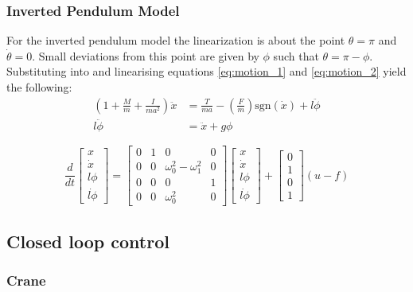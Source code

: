 \documentclass{article}
\begin{document}
\subsubsection{Inverted Pendulum Model}

For the inverted pendulum model the linearization is about the point $\theta = \pi$ and $\dot{\theta} = 0$.
Small deviations from this point are given by $\phi$ such that $\theta = \pi - \phi$.
Substituting into and linearising equations \ref{eq:motion_1} and \ref{eq:motion_2} yield the following:
\begin{align}
  \left( 1 + \frac{M}{m} + \frac{I}{ma^2} \right) \ddot{x} &= \frac{T}{ma} - \left(\frac{F}{m} \right)\text{sgn}(\dot{x}) + l \ddot{\phi} \\
  l \ddot{\phi} &= \ddot{x} + g\phi \label{eq:invp_motion_2}
\end{align}

\begin{equation}
  \frac{d}{dt} 
  \begin{bmatrix}
     x \\ \dot{x} \\ l\phi \\ \dot{l\phi} \end{bmatrix} = \begin{bmatrix} 
      0 & 1 & 0 & 0 \\ 0 & 0 & \omega_0^2 - \omega_1^2 & 0 \\ 0 & 0 & 0 & 1 \\ 0 & 0 & \omega_0^2 & 0 \end{bmatrix} \begin{bmatrix} 
        x \\ \dot{x} \\ l\phi \\ \dot{l\phi} \end{bmatrix} + \begin{bmatrix} 
          0 \\ 1 \\ 0 \\ 1 \end{bmatrix} (u - f)
\end{equation}

\subsection{Closed loop control}

\subsubsection{Crane}
\end{document}
